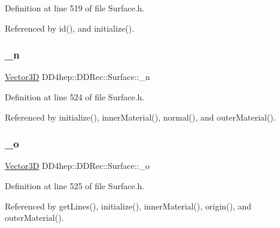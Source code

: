 Definition at line 519 of file Surface.\+h.



Referenced by id(), and initialize().

\hypertarget{class_d_d4hep_1_1_d_d_rec_1_1_surface_a9191ee82058481753f4d5d5234415382}{}\label{class_d_d4hep_1_1_d_d_rec_1_1_surface_a9191ee82058481753f4d5d5234415382} 
\subsubsection{\texorpdfstring{\+\_\+n}{\_n}}
{\footnotesize\ttfamily \hyperlink{class_d_d_surfaces_1_1_vector3_d}{Vector3D} D\+D4hep\+::\+D\+D\+Rec\+::\+Surface\+::\+\_\+n\hspace{0.3cm}{\ttfamily [protected]}}



Definition at line 524 of file Surface.\+h.



Referenced by initialize(), inner\+Material(), normal(), and outer\+Material().

\hypertarget{class_d_d4hep_1_1_d_d_rec_1_1_surface_aab036a2e1a02dcc393f03a901fea39d4}{}\label{class_d_d4hep_1_1_d_d_rec_1_1_surface_aab036a2e1a02dcc393f03a901fea39d4} 
\subsubsection{\texorpdfstring{\+\_\+o}{\_o}}
{\footnotesize\ttfamily \hyperlink{class_d_d_surfaces_1_1_vector3_d}{Vector3D} D\+D4hep\+::\+D\+D\+Rec\+::\+Surface\+::\+\_\+o\hspace{0.3cm}{\ttfamily [protected]}}



Definition at line 525 of file Surface.\+h.



Referenced by get\+Lines(), initialize(), inner\+Material(), origin(), and outer\+Material().

\hypertarget{class_d_d4hep_1_1_d_d_rec_1_1_surface_a1abb4367c088376f8607c45f9faaddb8}{}\label{class_d_d4hep_1_1_d_d_rec_1_1_surface_a1abb4367c088376f8607c45f9faaddb8} 
